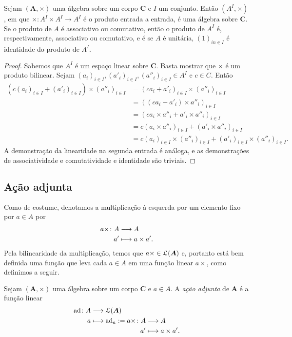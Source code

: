 \begin{proposition}
Sejam $(\bm A,\times)$ uma álgebra sobre um corpo $\bm C$ e $I$ um conjunto. Então $(A^I,\times)$, em que $\times\colon A^I \times A^I \to A^I$ é o produto entrada a entrada, é uma álgebra sobre $\bm C$. Se o produto de $A$ é associativo ou comutativo, então o produto de $A^I$ é, respectivamente, associativo ou comutativo, e é se $A$ é unitária, $(1)_{in \in I}$ é identidade do produto de $A^I$.
\end{proposition}
\begin{proof}
Sabemos que $A^I$ é um espaço linear sobre $\bm C$. Basta mostrar que $\times$ é um produto bilinear. Sejam $(a_i)_{i \in I},(a'_i)_{i \in I},(a''_i)_{i \in I} \in A^I$ e $c \in C$. Então
	\begin{align*}
	(c(a_i)_{i \in I} + (a'_i)_{i \in I}) \times (a''_i)_{i \in I} &= (ca_i + a'_i)_{i \in I} \times (a''_i)_{i \in I} \\
	&= ((ca_i + a'_i) \times a''_i)_{i \in I} \\
	&= (ca_i \times a''_i + a'_i \times a''_i)_{i \in I} \\
	&= c(a_i \times a''_i)_{i \in I} + (a'_i \times a''_i)_{i \in I} \\
	&= c(a_i)_{i \in I} \times (a''_i)_{i \in I} + (a'_i)_{i \in I} \times (a''_i)_{i \in I}.
	\end{align*}
A demonstração da linearidade na segunda entrada é análoga, e as demonstrações de associatividade e comutatividade e identidade são triviais.
\end{proof}

\subsection{Ação adjunta}

Como de costume, denotamos a multiplicação à esquerda por um elemento fixo por $a \in A$ por
	\begin{align*}
	{a\times}\colon {A} &\longrightarrow {A} \\{a'} &\longmapsto a \times a'.
	\end{align*}
Pela bilinearidade da multiplicação, temos que $a\times \in \mathcal{L}(\bm A)$ e, portanto está bem definida uma função que leva cada $a \in A$ em uma função linear $a\times$, como definimos a seguir.

\begin{definition}
Sejam $(\bm A,\times)$ uma álgebra sobre um corpo $\bm C$ e $a \in A$. A \emph{ação adjunta} de $\bm A$ é a função linear
	\begin{align*}
	\func{\adj}{A}{\lin(\bm A)}{a}{
		\adj_a :=
		\begin{aligned}[t]
		\func{a\times}{A}{A}{a'}{a \times a'}.
		\end{aligned}
	}
	\end{align*}
\end{definition}

